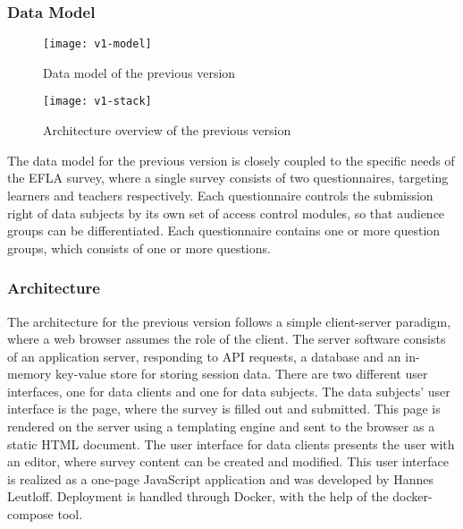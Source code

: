    \subsubsection{Data Model}

   \begin{figure}[H]
        \centering
        \texttt{[image: v1-model]}
        \caption{Data model of the previous version}
        \label{fig:v1-data-model}
    \end{figure}

    \begin{wrapfigure}{o}{.5\textwidth}
        \centering
        \texttt{[image: v1-stack]}
        \caption{Architecture overview of the previous version}
        \label{fig:v1-stack}
    \end{wrapfigure}

    The data model for the previous version is closely coupled to the specific needs of the
    EFLA survey, where a single survey consists of two questionnaires, targeting
    learners and teachers respectively.
    Each questionnaire controls the submission right of data subjects by its own set of access 
    control modules, so that audience groups can be differentiated.
    Each questionnaire contains one or more question groups, which consists of
    one or more questions.

    \subsubsection{Architecture}
        The architecture for the previous version follows a simple client-server paradigm, where
        a web browser assumes the role of the client. The server software consists of an
        application server, responding to API requests, a database and an in-memory
        key-value store for storing session data. There are two different user interfaces,
        one for data clients and one for data subjects. The data subjects' user interface
        is the page, where the survey is filled out and submitted. This page is rendered
        on the server using a templating engine and sent to the browser as a static HTML document.
        The user interface for data clients presents the user with an editor, where survey content
        can be created and modified. This user interface is realized as a one-page
        JavaScript application and was developed by Hannes Leutloff. Deployment is handled through
        Docker, with the help of the docker-compose tool.

